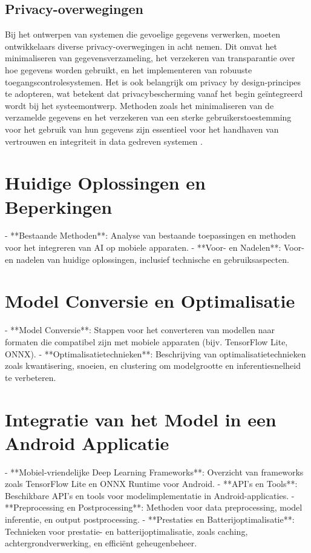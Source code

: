 \subsection{Privacy-overwegingen}

Bij het ontwerpen van systemen die gevoelige gegevens verwerken, moeten ontwikkelaars diverse privacy-overwegingen in acht nemen. Dit omvat het minimaliseren van gegevensverzameling, het verzekeren van transparantie over hoe gegevens worden gebruikt, en het implementeren van robuuste toegangscontrolesystemen. Het is ook belangrijk om privacy by design-principes te adopteren, wat betekent dat privacybescherming vanaf het begin geïntegreerd wordt bij het systeemontwerp. Methoden zoals het minimaliseren van de verzamelde gegevens en het verzekeren van een sterke gebruikerstoestemming voor het gebruik van hun gegevens zijn essentieel voor het handhaven van vertrouwen en integriteit in data gedreven systemen \autocite{Edwards2019}.


\section{Huidige Oplossingen en Beperkingen}

- **Bestaande Methoden**: Analyse van bestaande toepassingen en methoden voor het integreren van AI op mobiele apparaten.
- **Voor- en Nadelen**: Voor- en nadelen van huidige oplossingen, inclusief technische en gebruiksaspecten.

\section{Model Conversie en Optimalisatie}

- **Model Conversie**: Stappen voor het converteren van modellen naar formaten die compatibel zijn met mobiele apparaten (bijv. TensorFlow Lite, ONNX).
- **Optimalisatietechnieken**: Beschrijving van optimalisatietechnieken zoals kwantisering, snoeien, en clustering om modelgrootte en inferentiesnelheid te verbeteren.

\section{Integratie van het Model in een Android Applicatie}

- **Mobiel-vriendelijke Deep Learning Frameworks**: Overzicht van frameworks zoals TensorFlow Lite en ONNX Runtime voor Android.
- **API's en Tools**: Beschikbare API's en tools voor modelimplementatie in Android-applicaties.
- **Preprocessing en Postprocessing**: Methoden voor data preprocessing, model inferentie, en output postprocessing.
- **Prestaties en Batterijoptimalisatie**: Technieken voor prestatie- en batterijoptimalisatie, zoals caching, achtergrondverwerking, en efficiënt geheugenbeheer.

